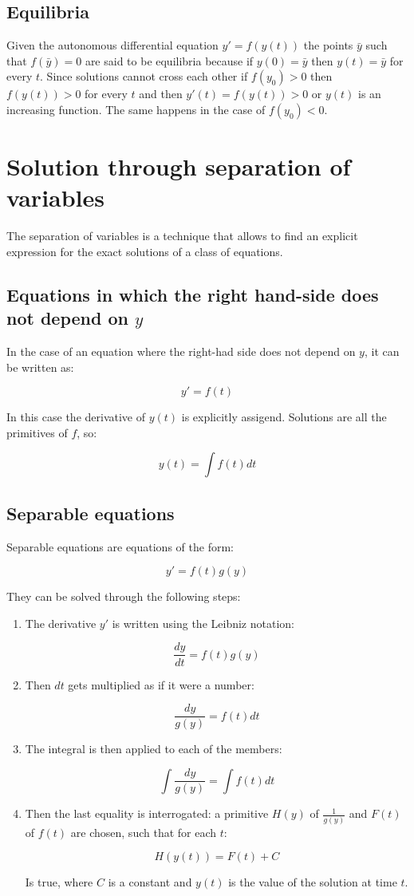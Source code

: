 	\subsection{Equilibria}
	Given the autonomous differential equation $y' = f(y(t))$ the points $\bar{y}$ such that $f(\bar{y})=0$ are said to be equilibria because if $y(0) = \bar{y}$ then $y(t) = \bar{y}$ for every $t$.
	Since solutions cannot cross each other if $f(y_0)>0$ then $f(y(t))>0$ for every $t$ and then $y'(t) = f(y(t))>0$ or $y(t)$ is an increasing function.
	The same happens in the case of $f(y_0)<0$.

\section{Solution through separation of variables}
The separation of variables is a technique that allows to find an explicit expression for the exact solutions of a class of equations.

	\subsection{Equations in which the right hand-side does not depend on $y$}
	In the case of an equation where the right-had side does not depend on $y$, it can be written as:

	$$y' = f(t)$$

	In this case the derivative of $y(t)$ is explicitly assigend.
	Solutions are all the primitives of $f$, so:

	$$y(t) = \int f(t)dt$$

	\subsection{Separable equations}
	Separable equations are equations of the form:

	$$y' = f(t)g(y)$$

	They can be solved through the following steps:

	\begin{enumerate}
		\item The derivative $y'$ is written using the Leibniz notation:

			$$\frac{dy}{dt} = f(t)g(y)$$

		\item Then $dt$ gets multiplied as if it were a number:

			$$\frac{dy}{g(y)} = f(t)dt$$

		\item The integral is then applied to each of the members:

			$$\int\frac{dy}{g(y)} = \int f(t)dt$$

		\item Then the last equality is interrogated: a primitive $H(y)$ of $\frac{1}{g(y)}$ and $F(t)$ of $f(t)$ are chosen, such that for each $t$:

			$$H(y(t)) = F(t) + C$$

			Is true, where $C$ is a constant and $y(t)$ is the value of the solution at time $t$.
	\end{enumerate}

